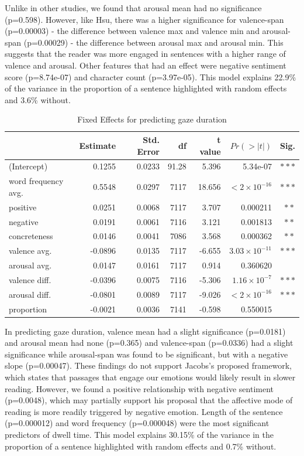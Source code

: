 \documentclass[11pt]{article}
\begin{document}
Unlike in other studies, we found that arousal mean had no significance (p=0.598).  However, like Hsu, there was a higher significance for valence-span (p=0.00003) - the difference between valence max and valence min and arousal-span (p=0.00029) - the difference between arousal max and arousal min. This suggests that the reader was more engaged in sentences with a higher range of valence and arousal. Other features that had an effect were negative sentiment score (p=8.74e-07) and character count (p=3.97e-05). This model explains 22.9\% of the variance in the proportion of a sentence highlighted with random effects and 3.6\% without.

\begin{table}[t]
  \centering
  \begin{tabular}{|l|r|r|r|r|r|r|}
  \hline
  & Estimate & Std. Error & df & t value & $Pr(>|t|)$ & Sig. \\
  \hline
  (Intercept) & 0.1255 & 0.0233 & 91.28 & 5.396 & 5.34e-07 & $\ast\ast\ast$ \\
  word frequency avg. & 0.5548 & 0.0297 & 7117 & 18.656 & $< 2 \times 10^{-16}$ & $\ast\ast\ast$ \\
  positive & 0.0251 & 0.0068 & 7117 & 3.707 & 0.000211 & $\ast\ast$ \\
  negative & 0.0191 & 0.0061 & 7116 & 3.121 & 0.001813 & $\ast\ast$ \\
  concreteness & 0.0146 & 0.0041 & 7086 & 3.568 & 0.000362 & $\ast\ast$ \\
  valence avg. & -0.0896 & 0.0135 & 7117 & -6.655 & $3.03 \times 10^{-11}$ & $\ast\ast\ast$ \\
  arousal avg. & 0.0147 & 0.0161 & 7117 & 0.914 & 0.360620 & \\
  valence diff. & -0.0396 & 0.0075 & 7116 & -5.306 & $1.16 \times 10^{-7}$ & $\ast\ast\ast$ \\
  arousal diff. & -0.0801 & 0.0089 & 7117 & -9.026 & $< 2 \times 10^{-16}$ & $\ast\ast\ast$ \\
  proportion & -0.0021 & 0.0036 & 7141 & -0.598 & 0.550015 & \\
  \hline
  \end{tabular}
  \caption{Fixed Effects for predicting gaze duration}
  \label{tab:accents}
  \end{table}

In predicting gaze duration, valence mean had a slight significance (p=0.0181) and arousal mean had none (p=0.365) and valence-span (p=0.0336) had a slight significance while arousal-span was found to be significant, but with a negative slope (p=0.00047). These findings do not support Jacobs's proposed framework, which states that passages that engage our emotions would likely result in slower reading. However, we found a positive relationship with negative sentiment (p=0.0048), which may partially support his proposal that the affective mode of reading is more readily triggered by negative emotion. Length of the sentence (p=0.000012) and word frequency (p=0.000048) were the most significant predictors of dwell time. This model explains 30.15\% of the variance in the proportion of a sentence highlighted with random effects and 0.7\% without. 
\end{document}
